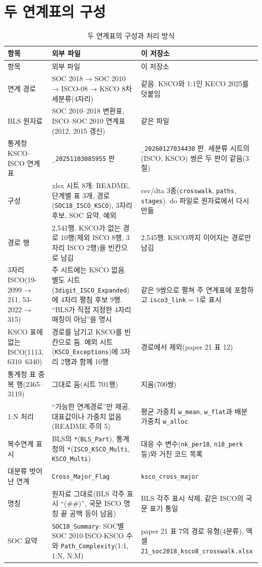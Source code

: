 \documentclass[11pt]{article}
\begin{document}
\section{두 연계표의 구성}

\begin{longtable}{L{3.2cm}L{6.4cm}L{6.4cm}}
\caption{두 연계표의 구성과 처리 방식}\label{tab:compose}\\
\toprule
항목 & 외부 파일 & 이 저장소 \\
\midrule
\endfirsthead
\toprule
항목 & 외부 파일 & 이 저장소 \\
\midrule
\endhead
연계 경로 & SOC 2018 → SOC 2010 → ISCO-08 → KSCO 8차 세분류(4자리) & 같음. KSCO와 1:1인 KECO 2025를 덧붙임 \\
BLS 원자료 & SOC 2010–2018 변환표, ISCO–SOC 2010 연계표(2012, 2015 갱신) & 같은 파일 \\
통계청 KSCO–ISCO 연계표 & \texttt{\_20251103085955} 판 & \texttt{\_20260127034430} 판. 세분류 시트의 (ISCO, KSCO) 쌍은 두 판이 같음(3절) \\
구성 & xlsx 시트 8개: README, 단계별 표 3개, 경로(\texttt{SOC18\_ISCO\_KSCO}), 3자리 후보, SOC 요약, 예외 & csv/dta 3종(\texttt{crosswalk}, \texttt{paths}, \texttt{stages}). do 파일로 원자료에서 다시 만듦 \\
경로 행 & 2,541행. KSCO가 없는 경로 10행(제외 ISCO 8행, 3자리 ISCO 2행)을 빈칸으로 남김 & 2,545행. KSCO까지 이어지는 경로만 남김 \\
3자리 ISCO(19-2099 → 211, 53-2022 → 315) & 주 시트에는 KSCO 없음. 별도 시트(\texttt{3digit\_ISCO\_Expanded})에 4자리 펼침 후보 9행. ``BLS가 직접 지정한 4자리 매칭이 아님''을 명시 & 같은 9쌍으로 펼쳐 주 연계표에 포함하고 \texttt{isco3\_link} = 1로 표시 \\
KSCO 표에 없는 ISCO(1113, 6310~6340) & 경로를 남기고 KSCO를 빈칸으로 둠. 예외 시트(\texttt{KSCO\_Exceptions})에 3자리 2행과 함께 10행 & 경로에서 제외(paper 21 표 12) \\
통계청 표 중복 행(2365–3119) & 그대로 둠(시트 701행) & 지움(700쌍) \\
1:N 처리 & ``가능한 연계경로''만 제공, 대표값이나 가중치 없음(README 주의 5) & 평균 가중치 \texttt{w\_mean}, \texttt{w\_flat}과 배분 가중치 \texttt{w\_alloc} \\
복수연계 표시 & BLS의 \texttt{*}(\texttt{BLS\_Part}), 통계청의 \texttt{*}(\texttt{ISCO\_KSCO\_Multi}, \texttt{KSCO\_Multi}) & 대응 수 변수(\texttt{nk\_per18}, \texttt{n18\_perk} 등)와 거친 코드 목록 \\
대분류 벗어난 연계 & \texttt{Cross\_Major\_Flag} & \texttt{ksco\_cross\_major} \\
명칭 & 원자료 그대로(BLS 각주 표시 ``(\#\#)'', 국문 ISCO 명칭 끝 공백 등이 남음) & BLS 각주 표시 삭제, 같은 ISCO의 국문 표기 통일 \\
SOC 요약 & \texttt{SOC18\_Summary}: SOC별 SOC 2010$\cdot$ISCO$\cdot$KSCO 수와 \texttt{Path\_Complexity}(1:1, 1:N, N:M) & paper 21 표 7의 경로 유형(4분류), 엑셀 \texttt{21\_soc2018\_ksco8\_crosswalk.xlsx} \\
\bottomrule
\end{longtable}
\end{document}

